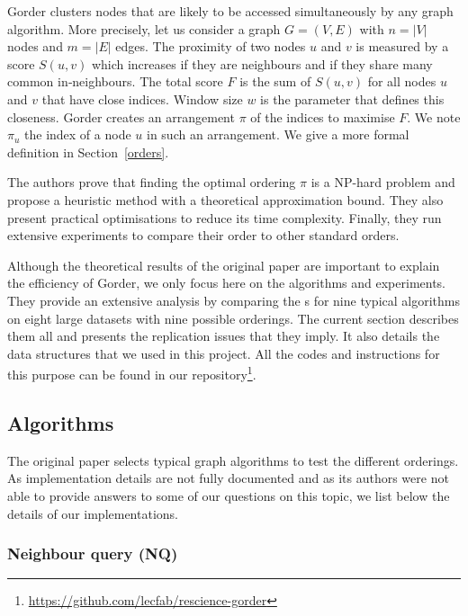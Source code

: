  Gorder clusters nodes that are likely to be accessed simultaneously by any graph algorithm.
 More precisely, let us consider a graph $G=(V,E)$ with $n=|V|$ nodes and $m=|E|$ edges. The proximity of two nodes $u$ and $v$ is measured by a score $S(u,v)$ which increases if they are neighbours and if they share many common in‐neighbours.
 The total score $F$ is the sum of $S(u,v)$ for all nodes $u$ and $v$ that have close indices. 
 Window size $w$ is the parameter that defines this closeness.
 Gorder creates an arrangement $\pi$ of the indices to maximise $F$. 
 We note $\pi_u$ the index of a node $u$ in such an arrangement.
 We give a more formal definition in Section~\ref{orders}.



 The authors prove that finding the optimal ordering $\pi$ is a NP-hard problem and propose a heuristic method with a theoretical approximation bound. %
%
 They also present practical optimisations to reduce its time complexity. 
 Finally, they run extensive experiments to compare their order to other standard orders. 

Although the theoretical results of the original paper are important to explain the efficiency of Gorder, we only focus here on the algorithms and experiments. They provide an extensive analysis by comparing the \runtime s for nine typical algorithms on eight large datasets with nine possible orderings. The current section describes them all and presents the replication issues that they imply. It also details the data structures that we used in this project. All the codes and instructions for this purpose can be found in our repository\footnote{\url{https://github.com/lecfab/rescience-gorder}}.




\subsection{Algorithms} \label{algorithms}

The original paper selects typical graph algorithms to test the different orderings. 
%
As implementation details are not fully documented and as its authors were not able to provide answers to some of our questions on this topic, we list below the details of our implementations.


\subsubsection{Neighbour query (NQ)}

